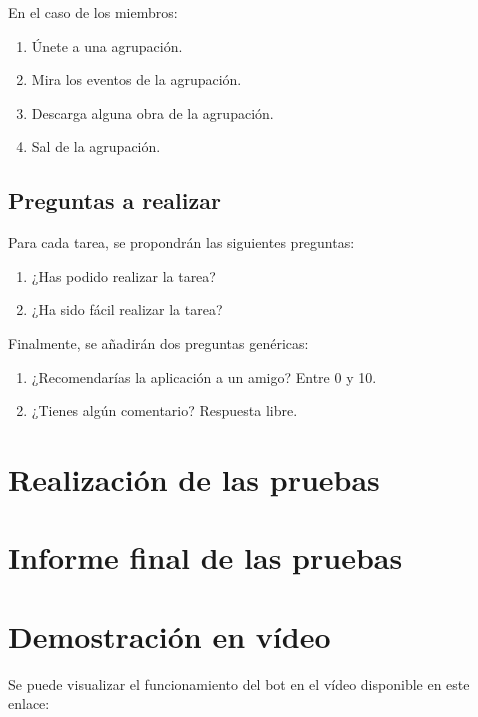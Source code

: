 En el caso de los miembros:

\begin{enumerate}
    \item Únete a una agrupación.
    \item Mira los eventos de la agrupación.
    \item Descarga alguna obra de la agrupación.
    \item Sal de la agrupación.
\end{enumerate}


\subsection{Preguntas a realizar}

Para cada tarea, se propondrán las siguientes preguntas:
\begin{enumerate}
    \item ¿Has podido realizar la tarea?
    \item ¿Ha sido fácil realizar la tarea?
\end{enumerate}

Finalmente, se añadirán dos preguntas genéricas:

\begin{enumerate}
    \item ¿Recomendarías la aplicación a un amigo? Entre 0 y 10.
    \item ¿Tienes algún comentario? Respuesta libre.
\end{enumerate}

\section{Realización de las pruebas}


\section{Informe final de las pruebas}


\section{Demostración en vídeo}

Se puede visualizar el funcionamiento del bot en el vídeo disponible en este enlace:
\url{}

